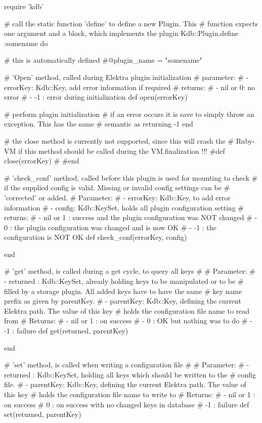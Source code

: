 \begin{DoxyCode}
require 'kdb'

# call the static function 'define' to define a new Plugin. This
# function expects one argument and a block, which implements the plugin
Kdb::Plugin.define :somename do

  # this is automatically defined
  #@plugin\_name = "somename"


  # 'Open' method, called during Elektra plugin initialization
  # parameter:
  #  - errorKey: Kdb::Key, add error information if required
  # returns:
  #  - nil or 0: no error
  #  - -1      : error during initialization
  def open(errorKey)

    # perform plugin initialization
    # if an error occurs it is save to simply throw an exception. This has the same
    # semantic as returning -1
  end

  # the close method is currently not supported, since this will crash the
  # Ruby-VM if this method should be called during the VM.finalization !!!
  #def close(errorKey)
  #
  #end


  # 'check\_conf' method, called before this plugin is used for mounting to check
  # if the supplied config is valid. Missing or invalid config settings can be
  # 'corrected' or added.
  # Parameter:
  #  - errorKey: Kdb::Key, to add error information
  #  - config: Kdb::KeySet, holds all plugin configuration setting
  # returns:
  #  - nil or 1 : success and the plugin configuration was NOT changed
  #  -        0 : the plugin configuration was changed and is now OK
  #  -       -1 : the configuration is NOT OK
  def check\_conf(errorKey, config)

  end


  # 'get' method, is called during a get cycle, to query all keys
  #
  # Parameter:
  #  - returned : Kdb::KeySet, already holding keys to be manipulated or to be
  #               filled by a storage plugin. All added keys have to have the same
  #               key name prefix as given by parentKey.
  #  - parentKey: Kdb::Key, defining the current Elektra path. The value of this key
  #               holds the configuration file name to read from
  # Returns:
  #  - nil or 1 : on success
  #  -        0 : OK but nothing was to do
  #  -       -1 : failure
  def get(returned, parentKey)

  end


  # 'set' method, is called when writing a configuration file
  #
  # Parameter:
  #  - returned : Kdb::KeySet, holding all keys which should be written to the
  #               config file.
  #  - parentKey: Kdb::Key, defining the current Elektra path. The value of this key
  #               holds the configuration file name to write to
  # Returns:
  #  - nil or 1 : on success
  #           0 : on success with no changed keys in database
  #          -1 : failure
  def set(returned, parentKey)


\end{DoxyCode}
